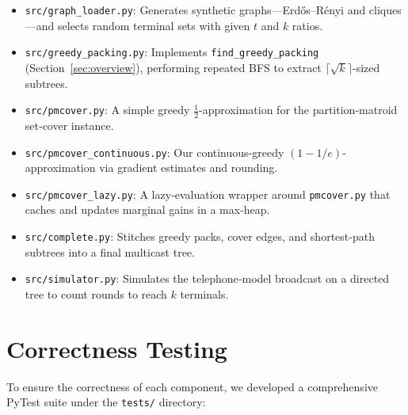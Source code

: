 \documentclass[12pt]{article}
\begin{document}
\begin{itemize}
  \item \texttt{src/graph\_loader.py}:  
    Generates synthetic graphs—Erdős–Rényi and cliques—and selects random terminal sets with given \(t\) and \(k\) ratios.  
  \item \texttt{src/greedy\_packing.py}:  
    Implements \texttt{find\_greedy\_packing} (Section~\ref{sec:overview}), performing repeated BFS to extract \(\lceil\sqrt{k}\rceil\)-sized subtrees.  
  \item \texttt{src/pmcover.py}:  
    A simple greedy \(\tfrac12\)-approximation for the partition-matroid set‐cover instance.  
  \item \texttt{src/pmcover\_continuous.py}:  
    Our continuous-greedy \((1-1/e)\)-approximation via gradient estimates and rounding.  
  \item \texttt{src/pmcover\_lazy.py}:  
    A lazy‐evaluation wrapper around \texttt{pmcover.py} that caches and updates marginal gains in a max‐heap.  
  \item \texttt{src/complete.py}:  
    Stitches greedy packs, cover edges, and shortest‐path subtrees into a final multicast tree.  
  \item \texttt{src/simulator.py}:  
    Simulates the telephone‐model broadcast on a directed tree to count rounds to reach \(k\) terminals.  
\end{itemize}

\section{Correctness Testing}
\label{sec:correct}

To ensure the correctness of each component, we developed a comprehensive PyTest suite under the \texttt{tests/} directory:
\end{document}
